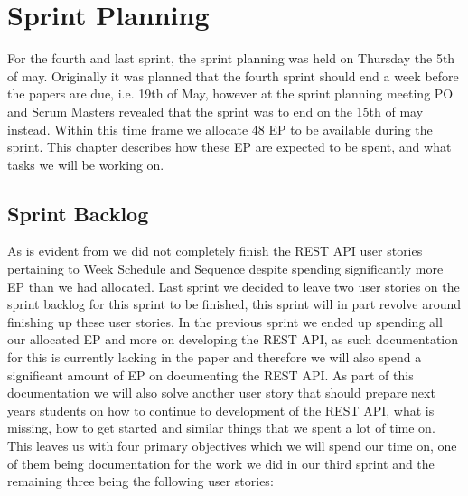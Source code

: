 \chapter{Sprint Planning}\label{chap:Planning4}
For the fourth and last sprint, the sprint planning was held on Thursday the 5th of may.
Originally it was planned that the fourth sprint should end a week before the papers are due, i.e. 19th of May, however at the sprint planning meeting PO and Scrum Masters revealed that the sprint was to end on the 15th of may instead.
Within this time frame we allocate 48 EP to be available during the sprint.
This chapter describes how these EP are expected to be spent, and what tasks we will be working on.

\section{Sprint Backlog}
As is evident from  we did not completely finish the REST API user stories pertaining to Week Schedule and Sequence despite spending significantly more EP than we had allocated.
Last sprint we decided to leave two user stories on the sprint backlog for this sprint to be finished, this sprint will in part revolve around finishing up these user stories.
In the previous sprint we ended up spending all our allocated EP and more on developing the REST API, as such documentation for this is currently lacking in the paper and therefore we will also spend a significant amount of EP on documenting the REST API.
As part of this documentation we will also solve another user story that should prepare next years students on how to continue to development of the REST API, what is missing, how to get started and similar things that we spent a lot of time on.
This leaves us with four primary objectives which we will spend our time on, one of them being documentation for the work we did in our third sprint and the remaining three being the following user stories:

\begin{center}
\medskip
{}
\medskip
{}
\end{center}

